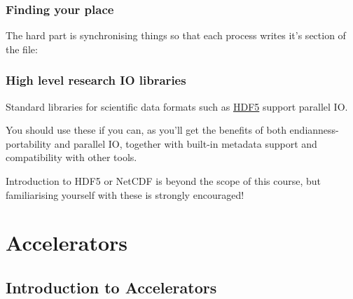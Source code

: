 \subsubsection{Finding your place}\label{finding-your-place}

The hard part is synchronising things so that each process writes it's
section of the file:

\begin{Shaded}
\begin{Highlighting}[]

    \NormalTok{* }\NormalTok{(}\NormalTok{) +                                      }
               \NormalTok{(}\NormalTok{) +          }
               \NormalTok{(}\NormalTok{); }

\end{Highlighting}
\end{Shaded}

\subsubsection{High level research IO
libraries}\label{high-level-research-io-libraries}

Standard libraries for scientific data formats such as
\href{http://www.hdfgroup.org/HDF5/}{HDF5} support parallel IO.

You should use these if you can, as you'll get the benefits of both
endianness-portability and parallel IO, together with built-in metadata
support and compatibility with other tools.

Introduction to HDF5 or NetCDF is beyond the scope of this course, but
familiarising yourself with these is strongly encouraged!

\section{Accelerators}\label{accelerators}

\subsection{Introduction to
Accelerators}\label{introduction-to-accelerators}


